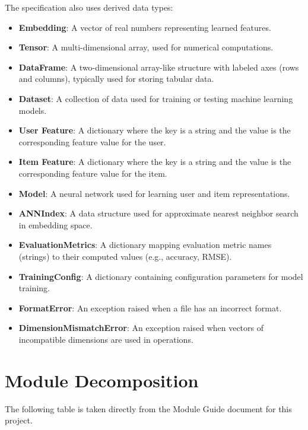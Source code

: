 \documentclass[12pt, titlepage]{article}
\begin{document}
The specification also uses derived data types:
\begin{itemize}
  \item \textbf{Embedding}: A vector of real numbers representing learned features.
  \item \textbf{Tensor}: A multi-dimensional array, used for numerical computations.
  \item \textbf{DataFrame}: A two-dimensional array-like structure with labeled axes (rows and columns), typically used for storing tabular data.
  \item \textbf{Dataset}: A collection of data used for training or testing machine learning models.
  \item \textbf{User Feature}: A dictionary where the key is a string and the value is the corresponding feature value for the user.
  \item \textbf{Item Feature}: A dictionary where the key is a string and the value is the corresponding feature value for the item.
  \item \textbf{Model}: A neural network used for learning user and item representations.
  \item \textbf{ANNIndex}: A data structure used for approximate nearest neighbor search in embedding space.
  \item \textbf{EvaluationMetrics}: A dictionary mapping evaluation metric names (strings) to their computed values (e.g., accuracy, RMSE).
  \item \textbf{TrainingConfig}: A dictionary containing configuration parameters for model training.
  \item \textbf{FormatError}: An exception raised when a file has an incorrect format.
  \item \textbf{DimensionMismatchError}: An exception raised when vectors of incompatible dimensions are used in operations.
\end{itemize}

\section{Module Decomposition}

The following table is taken directly from the Module Guide document for this project.
\end{document}
